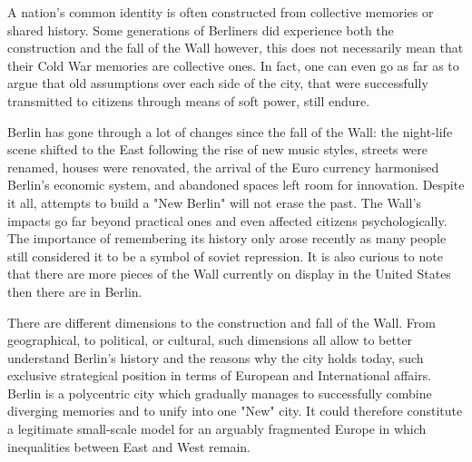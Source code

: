    A nation's common identity is often constructed from collective
   memories or shared history. Some generations of Berliners did
   experience both the construction and the fall of the Wall however, this
   does not necessarily mean that their Cold War memories are collective
   ones. In fact, one can even go as far as to argue that old assumptions
   over each side of the city, that were successfully transmitted to
   citizens through means of soft power, still endure.

   Berlin has gone through a lot of changes since the fall of the Wall:
   the night-life scene shifted to the East following the rise of new
   music styles, streets were renamed, houses were renovated, the arrival
   of the Euro currency harmonised Berlin's economic system, and abandoned
   spaces left room for innovation. Despite it all, attempts to build a
   "New Berlin" will not erase the past. The Wall's impacts go far beyond
   practical ones and even affected citizens psychologically. The
   importance of remembering its history only arose recently as many
   people still considered it to be a symbol of soviet repression. It is
   also curious to note that there are more pieces of the Wall currently
   on display in the United States then there are in Berlin.

   There are different dimensions to the construction and fall of the
   Wall. From geographical, to political, or cultural, such dimensions all
   allow to better understand Berlin's history and the reasons why the
   city holds today, such exclusive strategical position in terms of
   European and International affairs. Berlin is a polycentric city which
   gradually manages to successfully combine diverging memories and to
   unify into one "New" city. It could therefore constitute a legitimate
   small-scale model for an arguably fragmented Europe in which
   inequalities between East and West remain.


